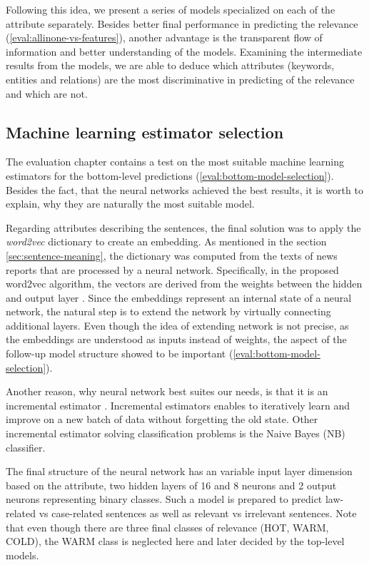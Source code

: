 \documentclass[
  digital, %
  notable,   %
  nolof,     %
  nolot,     %
]{fithesis3}
\begin{document}
Following this idea, we present a series of models specialized on each of the attribute separately.
Besides better final performance in predicting the relevance (\ref{eval:allinone-vs-features}), another advantage is the transparent flow of information and better understanding of the models.
Examining the intermediate results from the models, we are able to deduce which attributes (keywords, entities and relations) are the most discriminative in predicting of the relevance and which are not.

\subsection{Machine learning estimator selection}
\label{sec:bottom-level-nn}
The evaluation chapter contains a test on the most suitable machine learning estimators for the bottom-level predictions (\ref{eval:bottom-model-selection}).
Besides the fact, that the neural networks achieved the best results, it is worth to explain, why they are naturally the most suitable model.

Regarding attributes describing the sentences, the final solution was to apply the \textit{word2vec} dictionary to create an embedding.
As mentioned in the section \ref{sec:sentence-meaning}, the dictionary was computed from the texts of news reports that are processed by a neural network.
Specifically, in the proposed word2vec algorithm, the vectors are derived from the weights between the hidden and output layer \cite[sec. 2.2.1]{wordEmbeddings}.
Since the embeddings represent an internal state of a neural network, the natural step is to extend the network by virtually connecting additional layers.
Even though the idea of extending network is not precise, as the embeddings are understood as inputs instead of weights, the aspect of the follow-up model structure showed to be important (\ref{eval:bottom-model-selection}).

Another reason, why neural network best suites our needs, is that it is an incremental estimator \cite{incrementalScikit}.
Incremental estimators enables to iteratively learn and improve on a new batch of data without forgetting the old state.
Other incremental estimator solving classification problems is the Naive Bayes (NB) classifier.

The final structure of the neural network has an variable input layer dimension based on the attribute, two hidden layers of 16 and 8 neurons and 2 output neurons representing binary classes.
Such a model is prepared to predict law-related vs case-related sentences as well as relevant vs irrelevant sentences. Note that even though there are three final classes of relevance (HOT, WARM, COLD), the WARM class is neglected here and later decided by the top-level models.
\end{document}
